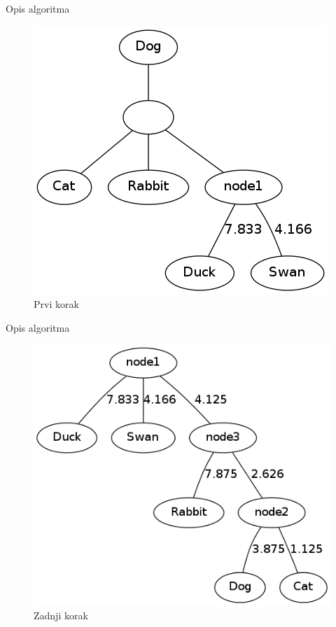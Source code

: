 \documentclass[utf8]{beamer}
\begin{document}
\begin{frame}{Opis algoritma}
\begin{figure}[htb]
\centering
\includegraphics[scale=0.4]{../Dokumentacija/img/prvi.png}
\caption{Prvi korak}
\end{figure}
\end{frame}

\begin{frame}{Opis algoritma}
\begin{figure}[htb]
\centering
\includegraphics[scale=0.4]{../Dokumentacija/img/zadnji.png}
\caption{Zadnji korak}
\end{figure}
\end{frame}
\end{document}
